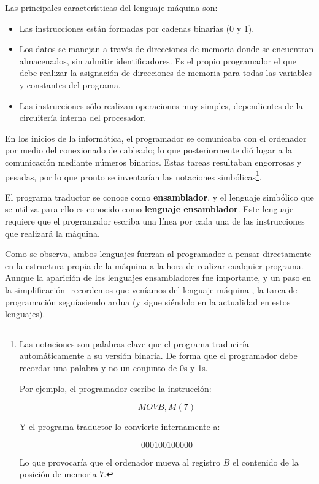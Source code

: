 \documentclass[a4paper, 11pt, titlepage]{article}
\begin{document}
    Las principales características del lenguaje máquina son:

    \begin{itemize}
        \item Las instrucciones están formadas por cadenas binarias (0 y 1).
        \item Los datos se manejan a través de direcciones de memoria donde se encuentran
        almacenados, sin admitir identificadores. Es el propio programador el que debe 
        realizar la asignación de direcciones de memoria para todas las variables y 
        constantes del programa.
        \item Las instrucciones sólo realizan operaciones muy simples, dependientes de 
        la circuitería interna del procesador.
    \end{itemize}

    En los inicios de la informática, el programador se comunicaba con el ordenador 
    por medio del conexionado de cableado; lo que posteriormente dió lugar a la 
    comunicación mediante números binarios. Estas tareas resultaban engorrosas y pesadas, 
    por lo que pronto se inventarían las notaciones simbólicas\footnote{
        Las notaciones son palabras clave que el programa traduciría automáticamente 
        a su versión binaria. De forma que el programador debe recordar una palabra
        y no un conjunto de 0s y 1s.

        Por ejemplo, el programador escribe la instrucción:

        \[MOV B , M(7)\]

        Y el programa traductor lo convierte internamente a:

        \[000100100000\]

        Lo que provocaría que el ordenador mueva al registro $B$ el contenido de la posición 
        de memoria $7$.
    }.

    El programa traductor se conoce como \textbf{ensamblador}, y el lenguaje simbólico
    que se utiliza para ello es conocido como \textbf{lenguaje ensamblador}. Este 
    lenguaje requiere que el programador escriba una línea por cada una de las 
    instrucciones que realizará la máquina.

    Como se observa, ambos lenguajes fuerzan al programador a pensar directamente en 
    la estructura propia de  la máquina a la hora de realizar cualquier programa.
    Aunque la aparición de los lenguajes ensambladores fue importante, y un paso en 
    la simplificación -recordemos que veníamos del lenguaje máquina-, la tarea de 
    programación seguíasiendo ardua (y sigue siéndolo en la actualidad en estos 
    lenguajes).
\end{document}
